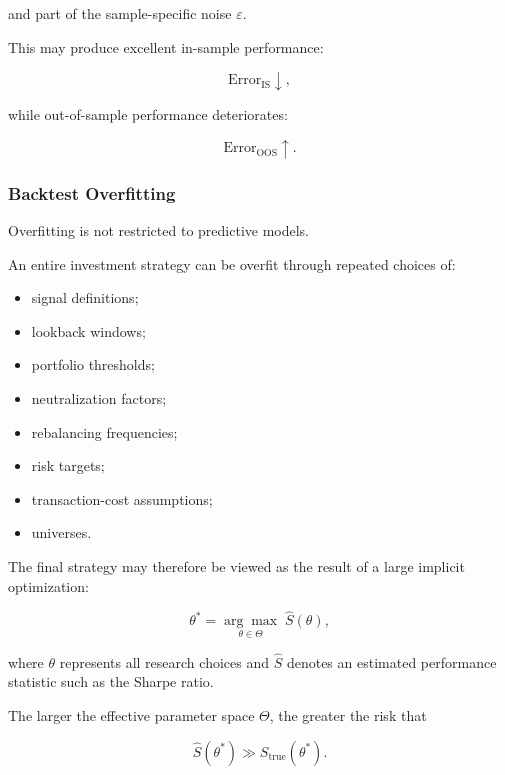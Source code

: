 \documentclass[11pt,a4paper]{article}
\begin{document}
and part of the sample-specific noise $\varepsilon$.

This may produce excellent in-sample performance:

\begin{equation}
\mathrm{Error}_{\mathrm{IS}}
\downarrow,
\end{equation}

while out-of-sample performance deteriorates:

\begin{equation}
\mathrm{Error}_{\mathrm{OOS}}
\uparrow.
\end{equation}


\subsubsection{Backtest Overfitting}

Overfitting is not restricted to predictive models.

An entire investment strategy can be overfit through repeated choices of:

\begin{itemize}
    \item signal definitions;
    \item lookback windows;
    \item portfolio thresholds;
    \item neutralization factors;
    \item rebalancing frequencies;
    \item risk targets;
    \item transaction-cost assumptions;
    \item universes.
\end{itemize}

The final strategy may therefore be viewed as the result of a large implicit
optimization:

\begin{equation}
\theta^*
=
\underset{\theta\in\Theta}{\arg\max}
\;
\widehat{S}(\theta),
\end{equation}

where $\theta$ represents all research choices and $\widehat{S}$ denotes an
estimated performance statistic such as the Sharpe ratio.

The larger the effective parameter space $\Theta$, the greater the risk that

\begin{equation}
\widehat{S}(\theta^*)
\gg
S_{\mathrm{true}}(\theta^*).
\end{equation}
\end{document}
